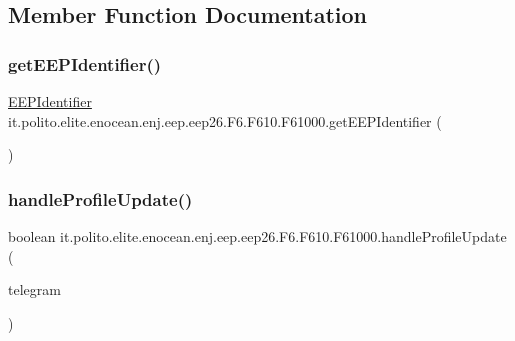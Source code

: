 \subsection{Member Function Documentation}
\hypertarget{classit_1_1polito_1_1elite_1_1enocean_1_1enj_1_1eep_1_1eep26_1_1_f6_1_1_f610_1_1_f61000_a9f9edc43aaab47e64c96c48530696805}{}\label{classit_1_1polito_1_1elite_1_1enocean_1_1enj_1_1eep_1_1eep26_1_1_f6_1_1_f610_1_1_f61000_a9f9edc43aaab47e64c96c48530696805} 
\subsubsection{\texorpdfstring{get\+E\+E\+P\+Identifier()}{getEEPIdentifier()}}
{\footnotesize\ttfamily \hyperlink{classit_1_1polito_1_1elite_1_1enocean_1_1enj_1_1eep_1_1_e_e_p_identifier}{E\+E\+P\+Identifier} it.\+polito.\+elite.\+enocean.\+enj.\+eep.\+eep26.\+F6.\+F610.\+F61000.\+get\+E\+E\+P\+Identifier (\begin{DoxyParamCaption}{ }\end{DoxyParamCaption})}

\hypertarget{classit_1_1polito_1_1elite_1_1enocean_1_1enj_1_1eep_1_1eep26_1_1_f6_1_1_f610_1_1_f61000_a27ab57856a01ce9a1fbb46ed6e44f3c1}{}\label{classit_1_1polito_1_1elite_1_1enocean_1_1enj_1_1eep_1_1eep26_1_1_f6_1_1_f610_1_1_f61000_a27ab57856a01ce9a1fbb46ed6e44f3c1} 
\subsubsection{\texorpdfstring{handle\+Profile\+Update()}{handleProfileUpdate()}}
{\footnotesize\ttfamily boolean it.\+polito.\+elite.\+enocean.\+enj.\+eep.\+eep26.\+F6.\+F610.\+F61000.\+handle\+Profile\+Update (\begin{DoxyParamCaption}\item[{\hyperlink{classit_1_1polito_1_1elite_1_1enocean_1_1enj_1_1eep_1_1eep26_1_1telegram_1_1_e_e_p26_telegram}{E\+E\+P26\+Telegram}}]{telegram }\end{DoxyParamCaption})}




